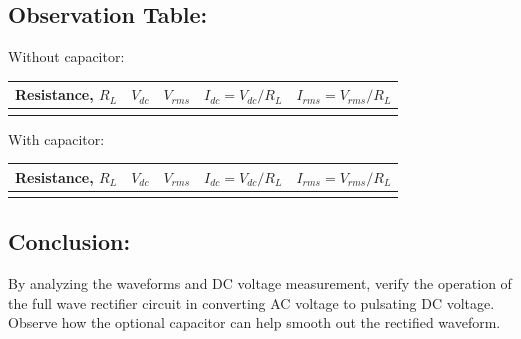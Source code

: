 \subsection*{Observation Table:}

\noindent Without capacitor:
\begin{table}[h]
    \centering
    \begin{tabular}{c|c|c|c|c}
        \hline
        Resistance, $R_L$ & $V_{dc}$ & $V_{rms}$ & $I_{dc} = V_{dc} / R_L$ & $I_{rms} = V_{rms} / R_L$ \\ \hline
         &  &   &    &  \\ \hline
    \end{tabular}
    \label{tab:without_cap}
\end{table}

\noindent With capacitor:
\begin{table}[h]
    \centering
    \begin{tabular}{c|c|c|c|c}
        \hline
        Resistance, $R_L$ & $V_{dc}$ & $V_{rms}$ & $I_{dc} = V_{dc} / R_L$ & $I_{rms} = V_{rms} / R_L$ \\ \hline
         &  &   &    &  \\ \hline
    \end{tabular}
    \label{tab:without_cap}
\end{table}

\subsection*{Conclusion:}
By analyzing the waveforms and DC voltage measurement, verify the operation of the full wave rectifier circuit in converting AC voltage to pulsating DC voltage. Observe how the optional capacitor can help smooth out the rectified waveform.


\newpage